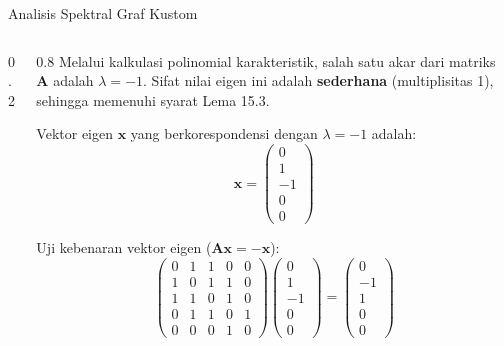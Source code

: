 \documentclass[aspectratio=169]{beamer}
\begin{document}
\begin{frame}[fragile]{Analisis Spektral Graf Kustom}
  \begin{columns}
    \begin{column}{0.2\textwidth}
    \end{column}

    \begin{column}{0.8\textwidth}
      \small
      Melalui kalkulasi polinomial karakteristik, salah satu akar dari matriks $\mathbf{A}$ adalah $\lambda = -1$.
      Sifat nilai eigen ini adalah \textbf{sederhana} (multiplisitas 1), sehingga memenuhi syarat Lema 15.3.

      \vspace{0.2cm}
      Vektor eigen $\mathbf{x}$ yang berkorespondensi dengan $\lambda = -1$ adalah:
      $$ \mathbf{x} = \begin{pmatrix} 0 \\ 1 \\ -1 \\ 0 \\ 0 \end{pmatrix} $$

      Uji kebenaran vektor eigen ($\mathbf{A}\mathbf{x} = -\mathbf{x}$):
      $$ \begin{pmatrix} 0 & 1 & 1 & 0 & 0 \\ 1 & 0 & 1 & 1 & 0 \\ 1 & 1 & 0 & 1 & 0 \\ 0 & 1 & 1 & 0 & 1 \\ 0 & 0 & 0 & 1 & 0 \end{pmatrix} \begin{pmatrix} 0 \\ 1 \\ -1 \\ 0 \\ 0 \end{pmatrix} = \begin{pmatrix} 0 \\ -1 \\ 1 \\ 0 \\ 0 \end{pmatrix} $$
    \end{column}
  \end{columns}
\end{frame}
\end{document}
